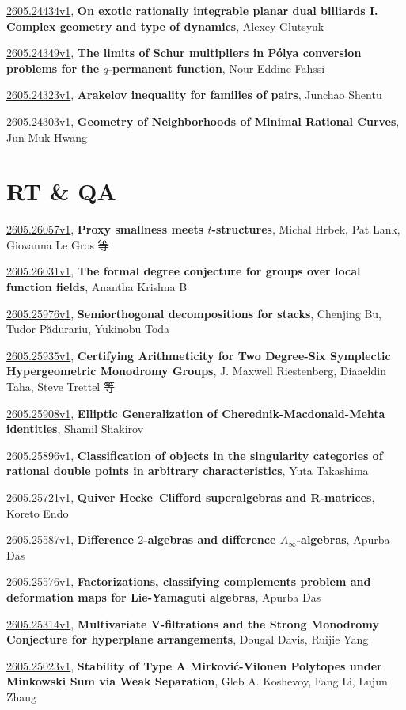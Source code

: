 \documentclass[9pt, a4paper]{article}
\theoremstyle{plain}
\theoremstyle{definition}
\theoremstyle{remark}
\newcommand{\arxiv}[3]{\href{https://arxiv.org/abs/#1}{#1}, \textbf{\textcolor{arxivblue}{#2}}, #3}
\begin{document}
\arxiv{2605.24434v1}{On exotic rationally integrable planar dual billiards I. Complex geometry and type of dynamics}{Alexey Glutsyuk}

\arxiv{2605.24349v1}{The limits of Schur multipliers in Pólya conversion problems for the $q$-permanent function}{Nour-Eddine Fahssi}

\arxiv{2605.24323v1}{Arakelov inequality for families of pairs}{Junchao Shentu}

\arxiv{2605.24303v1}{Geometry of Neighborhoods of Minimal Rational Curves}{Jun-Muk Hwang}


\section{RT \& QA}
\arxiv{2605.26057v1}{Proxy smallness meets $t$-structures}{Michal Hrbek, Pat Lank, Giovanna Le Gros 等}

\arxiv{2605.26031v1}{The formal degree conjecture for groups over local function fields}{Anantha Krishna B}

\arxiv{2605.25976v1}{Semiorthogonal decompositions for stacks}{Chenjing Bu, Tudor Pădurariu, Yukinobu Toda}

\arxiv{2605.25935v1}{Certifying Arithmeticity for Two Degree-Six Symplectic Hypergeometric Monodromy Groups}{J. Maxwell Riestenberg, Diaaeldin Taha, Steve Trettel 等}

\arxiv{2605.25908v1}{Elliptic Generalization of Cherednik-Macdonald-Mehta identities}{Shamil Shakirov}

\arxiv{2605.25896v1}{Classification of objects in the singularity categories of rational double points in arbitrary characteristics}{Yuta Takashima}

\arxiv{2605.25721v1}{Quiver Hecke--Clifford superalgebras and R-matrices}{Koreto Endo}

\arxiv{2605.25587v1}{Difference $2$-algebras and difference $A_\infty$-algebras}{Apurba Das}

\arxiv{2605.25576v1}{Factorizations, classifying complements problem and deformation maps for Lie-Yamaguti algebras}{Apurba Das}

\arxiv{2605.25314v1}{Multivariate V-filtrations and the Strong Monodromy Conjecture for hyperplane arrangements}{Dougal Davis, Ruijie Yang}

\arxiv{2605.25023v1}{Stability of Type A Mirković-Vilonen Polytopes under Minkowski Sum via Weak Separation}{Gleb A. Koshevoy, Fang Li, Lujun Zhang}
\end{document}
